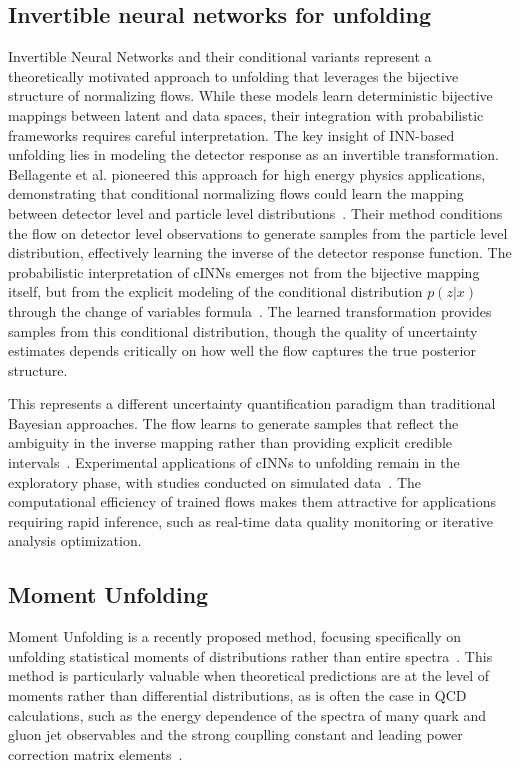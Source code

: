 \subsection{Invertible neural networks for unfolding}
    Invertible Neural Networks and their conditional variants represent a theoretically motivated approach to unfolding that leverages the bijective structure of normalizing flows.
    While these models learn deterministic bijective mappings between latent and data spaces, their integration with probabilistic frameworks requires careful interpretation.
    The key insight of INN-based unfolding lies in modeling the detector response as an invertible transformation.
    Bellagente et al. pioneered this approach for high energy physics applications, demonstrating that conditional normalizing flows could learn the mapping between detector level and particle level distributions~\cite{bellagente_how_2020}.
    Their method conditions the flow on detector level observations to generate samples from the particle level distribution, effectively learning the inverse of the detector response function.
    The probabilistic interpretation of cINNs emerges not from the bijective mapping itself, but from the explicit modeling of the conditional distribution $p(z|x)$ through the change of variables formula~\cite{Backes:2022sph}.
    The learned transformation provides samples from this conditional distribution, though the quality of uncertainty estimates depends critically on how well the flow captures the true posterior structure.
    
    This represents a different uncertainty quantification paradigm than traditional Bayesian approaches.
    The flow learns to generate samples that reflect the ambiguity in the inverse mapping rather than providing explicit credible intervals~\cite{AnanthaPadmanabha2021SolvingNetworks}.
    Experimental applications of cINNs to unfolding remain in the exploratory phase, with studies conducted on simulated data~\cite{Backes:2022sph}.
    The computational efficiency of trained flows makes them attractive for applications requiring rapid inference, such as real-time data quality monitoring or iterative analysis optimization.

    \subsection{Moment Unfolding}
    Moment Unfolding is a recently proposed method, focusing specifically on unfolding statistical moments of distributions rather than entire spectra~\cite{desai2024moment}.
    This method is particularly valuable when theoretical predictions are at the level of moments rather than differential distributions, as is often the case in QCD calculations, such as the energy dependence of the spectra of many quark and gluon jet observables and the strong couplling constant and leading power correction matrix elements~\cite{Abbate:2012jh,pahlStudyMomentsEvent2009,OPAL:2004wof,L3:2004cdh,DELPHI:2004omy,DELPHI:2003yqh,Altarelli:1977zs,gribovDeepInelasticEp1972,dokshitzerCalculationStructureFunctions1977}.

